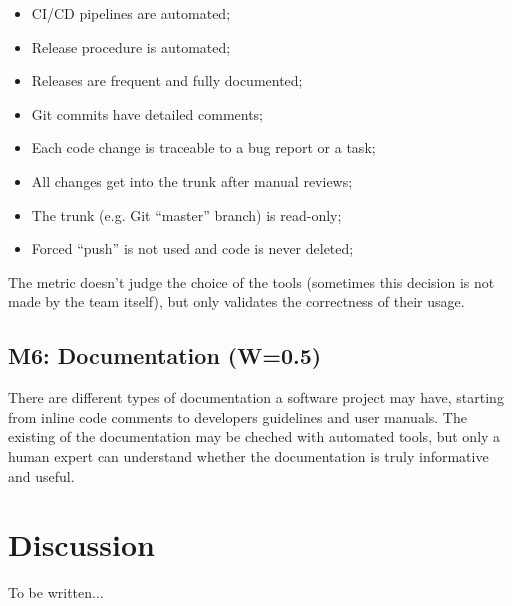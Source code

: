 \documentclass[12pt,oneside]{article}
\begin{document}
\begin{itemize}
  \item CI/CD pipelines are automated;
  \item Release procedure is automated;
  \item Releases are frequent and fully documented;
  \item Git commits have detailed comments;
  \item Each code change is traceable to a bug report or a task;
  \item All changes get into the trunk after manual reviews;
  \item The trunk (e.g. Git ``master'' branch) is read-only;
  \item Forced ``push'' is not used and code is never deleted;
\end{itemize}

The metric doesn't judge the choice of the tools (sometimes this decision
is not made by the team itself), but only validates the correctness
of their usage.

\subsection{M6: Documentation (W=0.5)}

There are different types of documentation a software project may have,
starting from inline code comments to developers guidelines and user manuals.
The existing of the documentation may be cheched with automated tools,
but only a human expert can understand whether the documentation is truly
informative and useful.

\section{Discussion}
\label{sec:discussion}

To be written...



\end{document}
